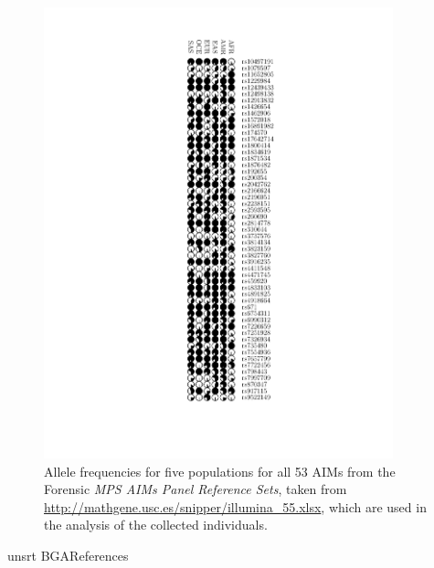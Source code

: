 \documentclass[12pt]{article}
\theoremstyle{definition}
\begin{document}
\begin{figure}[H]
  \parbox[b]{\textwidth}{\includegraphics[width=0.9\textwidth]{illumina_freqs.pdf}}
  \caption{\label{Sfig:allFreqs} Allele frequencies for five populations for all 53 AIMs from the Forensic {\em MPS AIMs Panel Reference Sets}, taken from \url{http://mathgene.usc.es/snipper/illumina_55.xlsx}, which are used in the analysis of the collected individuals.}
\end{figure}





{unsrt}
{BGA}{References}

\newpage

\thispagestyle{empty}
\end{document}
